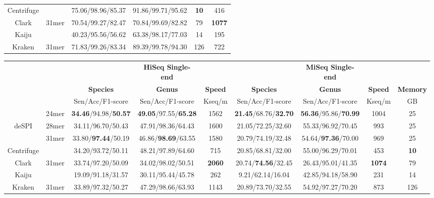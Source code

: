 \documentclass[a0,portrait]{a0poster}
\begin{document}
\begin{multicols}{2}
\begin{center}
\begin{tabular}{cccccc}
Centrifuge & & 75.06/98.96/85.37 & 91.86/99.71/95.62 & \textbf{10} & 416 \\
Clark & 31mer & 70.54/99.27/82.47 & 70.84/99.69/82.82 & 79 & \textbf{1077} \\
Kaiju & & 40.23/95.56/56.62 & 63.38/98.17/77.03 & 14 & 195 \\
Kraken & 31mer & 71.83/99.26/83.34 & 89.39/99.78/94.30 & 126 & 722 \\
\bottomrule
\end{tabular}
\end{center}\vspace{1cm}

\begin{center}\vspace{1cm}
\footnotesize
\begin{tabular}{ccccc|ccc|c}
\toprule
& & & \textbf{HiSeq Single-end} & && \textbf{MiSeq Single-end} & & \\
& & \textbf{Species} & \textbf{Genus} & \textbf{Speed} & \textbf{Species} & \textbf{Genus} & \textbf{Speed} & \textbf{Memory}\\
\cline{3-5}\cline{6-9}
& & Sen/Acc/F1-score & Sen/Acc/F1-score & Kseq/m &Sen/Acc/F1-score & Sen/Acc/F1-score & Kseq/m & GB\\
\midrule
& 24mer &\textbf{34.46}/94.98/\textbf{50.57} & \textbf{49.05}/97.55/\textbf{65.28} & 1562 & \textbf{21.45}/68.76/\textbf{32.70} & \textbf{56.36}/95.86/\textbf{70.99} & 1004 & 25 \\
deSPI & 28mer & 34.11/96.70/50.43 & 47.91/98.36/64.43 & 1600& 21.05/72.25/32.60 & 55.33/96.92/70.45 & 993& 25\\
 & 31mer & 33.80/\textbf{97.44}/50.19 & 46.86/\textbf{98.69}/63.55 & 1580 & 20.79/74.19/32.48 & 54.64/\textbf{97.36}/70.00 & 969 & 25\\
Centrifuge	 & & 34.20/93.72/50.11 & 48.21/97.89/64.60 & 715 &20.85/68.81/32.00 & 55.00/96.29/70.01 & 453 & \textbf{10}\\
Clark & 31mer & 33.74/97.20/50.09 & 34.02/98.02/50.51 & \textbf{2060} & 20.74/\textbf{74.56}/32.45 & 26.43/95.01/41.35 & \textbf{1074} & 79 \\
Kaiju	 & & 19.09/91.18/31.57 & 30.11/95.44/45.78 & 262 & 9.21/62.14/16.04 & 42.85/94.18/58.90 & 231 & 14\\
Kraken & 31mer & 33.89/97.32/50.27 & 47.29/98.66/63.93 & 1143 & 20.89/73.70/32.55 & 54.92/97.27/70.20 & 873 & 126\\
\bottomrule 
\end{tabular}
\end{center}\vspace{1cm}


\end{multicols}
\end{document}
